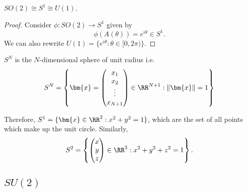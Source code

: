 \documentclass[12pt, a4paper]{article}
\begin{document}
\begin{mdthm}
    \(SO(2) \cong S^1 \cong U(1)\).
\end{mdthm}

\begin{proof}
    Consider \(\phi : SO(2) \to S^1\) given by 
    \[\phi(A(\theta))= e^{i\theta} \in S^1.\]
    We can also rewrite \(U(1)= \{e^{i\theta} : \theta \in [0,2\pi)\}\).
\end{proof}

\begin{definition}
    \(S^N\) is the \(N\)-dimensional sphere of unit radius i.e.
    \[S^N=\left\{\bm{x} = \begin{pmatrix} x_1 \\x_2 \\ \vdots \\x_{N+1} \end{pmatrix} \in \RR^{N+1} : \| \bm{x} \|=1\right\}\]
\end{definition}

\pagebreak

\begin{mdnote}
    Therefore, \(S^1 = \{\bm{x} \in \RR^2 : x^2+y^2=1\}\), which are the set of all points which make up the unit circle. Similarly, 
    \[S^2= \left\{ \begin{pmatrix} x\\y\\z\end{pmatrix} \in \RR^3 : x^2+y^2+z^2 =1\right\}.\]
\end{mdnote}

\subsection{\texorpdfstring{\(SU(2)\)}{TEXT}}
\end{document}
